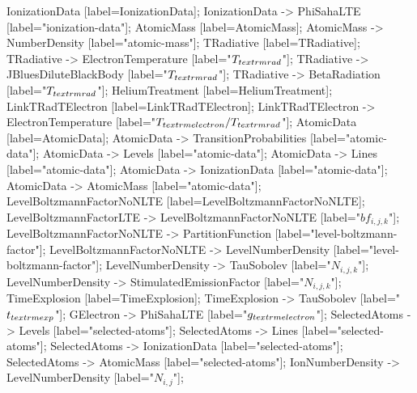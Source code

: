 {	IonizationData	 [label=IonizationData];
	IonizationData -> PhiSahaLTE	 [label="ionization-data"];
	AtomicMass	 [label=AtomicMass];
	AtomicMass -> NumberDensity	 [label="atomic-mass"];
	TRadiative	 [label=TRadiative];
	TRadiative -> ElectronTemperature	 [label="$T_{\\textrm{rad}}$"];
	TRadiative -> JBluesDiluteBlackBody	 [label="$T_{\\textrm{rad}}$"];
	TRadiative -> BetaRadiation	 [label="$T_{\\textrm{rad}}$"];
	HeliumTreatment	 [label=HeliumTreatment];
	LinkTRadTElectron	 [label=LinkTRadTElectron];
	LinkTRadTElectron -> ElectronTemperature	 [label="$T_{\\textrm{electron}}/T_{\\textrm{rad}}$"];
	AtomicData	 [label=AtomicData];
	AtomicData -> TransitionProbabilities	 [label="atomic-data"];
	AtomicData -> Levels	 [label="atomic-data"];
	AtomicData -> Lines	 [label="atomic-data"];
	AtomicData -> IonizationData	 [label="atomic-data"];
	AtomicData -> AtomicMass	 [label="atomic-data"];
	LevelBoltzmannFactorNoNLTE	 [label=LevelBoltzmannFactorNoNLTE];
	LevelBoltzmannFactorLTE -> LevelBoltzmannFactorNoNLTE	 [label="$bf_{i,j,k}$"];
	LevelBoltzmannFactorNoNLTE -> PartitionFunction	 [label="level-boltzmann-factor"];
	LevelBoltzmannFactorNoNLTE -> LevelNumberDensity	 [label="level-boltzmann-factor"];
	LevelNumberDensity -> TauSobolev	 [label="$N_{i,j,k}$"];
	LevelNumberDensity -> StimulatedEmissionFactor	 [label="$N_{i,j,k}$"];
	TimeExplosion	 [label=TimeExplosion];
	TimeExplosion -> TauSobolev	 [label="$t_{\\textrm{exp}}$"];
	GElectron -> PhiSahaLTE	 [label="$g_{\\textrm{electron}}$"];
	SelectedAtoms -> Levels	 [label="selected-atoms"];
	SelectedAtoms -> Lines	 [label="selected-atoms"];
	SelectedAtoms -> IonizationData	 [label="selected-atoms"];
	SelectedAtoms -> AtomicMass	 [label="selected-atoms"];
	IonNumberDensity -> LevelNumberDensity	 [label="$N_{i,j}$"];
}
